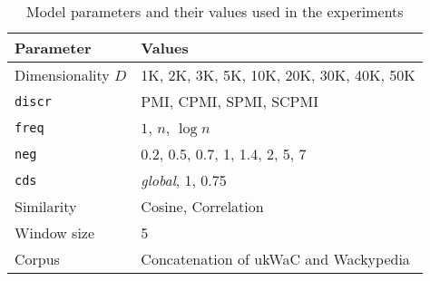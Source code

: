 \begin{table}
  \centering
  \begin{tabular}{ll}
    \toprule
    Parameter & Values \\
    \midrule
    Dimensionality $D$ & 1K, 2K, 3K, 5K, 10K, 20K, 30K, 40K, 50K \\
    \texttt{discr} & PMI, CPMI, SPMI, SCPMI \\
    \texttt{freq} & $1$, $n$, $\log n$ \\
    \texttt{neg} & 0.2, 0.5, 0.7, 1, 1.4, 2, 5, 7 \\
    \texttt{cds} & \textit{global}, 1, 0.75 \\
    Similarity & Cosine, Correlation \\
    Window size & 5                                \\
    Corpus & Concatenation of ukWaC and Wackypedia \\
    \bottomrule
  \end{tabular}
  \caption{Model parameters and their values used in the experiments}
\label{tab:parameters}
\end{table}

